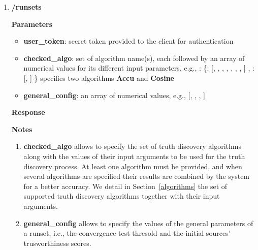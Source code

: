 \documentclass[a4paper,10pt]{scrartcl}
\newcommand{\lamine}[1]{\textcolor{blue}{#1}}
\begin{document}
\begin{enumerate}
%
 \item \textbf{/runsets}
\textbf{Parameters}
\begin{itemize}
 \item \textbf{user\_token}: secret token provided to the client for authentication 
 \item  \textbf{checked\_algo}: set of algorithm name(s), each followed by an array of numerical values 
 for its different input parameters, e.g., : \{: [, , , , , , , ] , : [, ] \}
specifies two algorithms \textbf{Accu} and \textbf{Cosine}
 \item \textbf{general\_config}: an array of numerical values, e.g., [, , , ]
\end{itemize}
\textbf{Response}
\textbf{Notes}
\begin{enumerate}
 \item \textbf{checked\_algo} allows to specify the set of truth discovery algorithms along with the values of their input arguments to be used for the truth discovery process. At least one algorithm must be provided, and when several algorithms
 are specified their results are combined by the system for a better accuracy. We detail in Section~\ref{algorithms} the set of supported truth discovery algorithms together with their input arguments.
\item \textbf{general\_config} allows to specify the values of the general parameters of a runset, i.e., the convergence test thresold and the initial sources' trusworthiness scores.
 \end{enumerate}
\end{enumerate}
\end{document}
